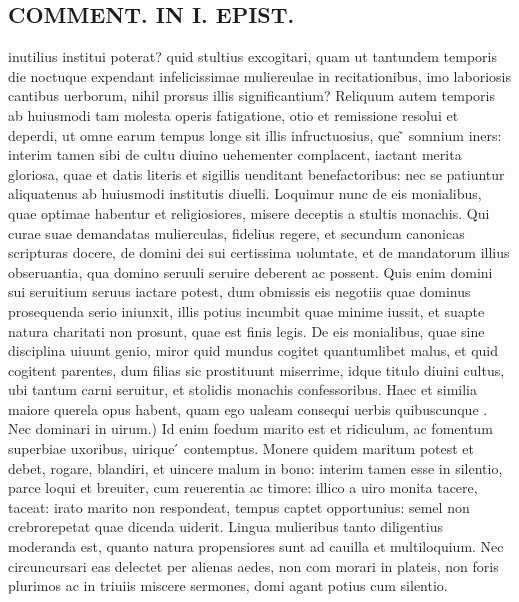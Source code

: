 \documentclass{article}
\begin{document}
\begin{pages}
\section*{COMMENT. IN I. EPIST. }
\marginpar{[ p.488 ]}\pstart inutilius institui poterat? quid stultius excogitari, quam ut tantundem temporis die noctuque expendant infelicissimae muliereulae in recitationibus, imo laboriosis cantibus uerborum, nihil prorsus illis significantium? Reliquum autem temporis ab huiusmodi tam molesta operis fatigatione, otio et remissione resolui et deperdi, ut omne earum tempus longe sit illis infructuosius, que ̃ somnium iners: interim tamen sibi de cultu diuino uehementer complacent, iactant merita gloriosa, quae et datis literis et sigillis uenditant benefactoribus: nec se patiuntur aliquatenus ab huiusmodi institutis diuelli. Loquimur nunc de eis monialibus, quae optimae habentur et religiosiores, misere deceptis a stultis monachis. Qui curae suae demandatas mulierculas, fidelius regere, et secundum canonicas scripturas docere, de domini dei sui certissima uoluntate, et de mandatorum illius obseruantia, qua domino seruuli seruire deberent ac possent. Quis enim domini sui seruitium seruus iactare potest, dum obmissis eis negotiis quae dominus prosequenda serio iniunxit, illis potius incumbit quae minime iussit, et suapte natura charitati non prosunt, quae est finis legis. De eis monialibus, quae sine disciplina uiuunt genio, miror quid mundus cogitet quantumlibet malus, et quid cogitent parentes, dum filias sic prostituunt miserrime, idque titulo diuini cultus, ubi tantum carni seruitur, et stolidis monachis confessoribus. Haec et similia maiore querela opus habent, quam ego ualeam consequi uerbis quibuscunque . Nec dominari in uirum.) Id enim foedum marito est et ridiculum, ac fomentum superbiae uxoribus, uirique ́ contemptus. Monere quidem maritum potest et debet, rogare, blandiri, et uincere malum in bono: interim tamen esse in silentio, parce loqui et breuiter, cum reuerentia ac timore: illico a uiro monita tacere, taceat: irato marito non respondeat, tempus captet opportunius: semel non crebrorepetat quae dicenda uiderit. Lingua mulieribus tanto diligentius moderanda est, quanto natura propensiores sunt ad cauilla et multiloquium. Nec circuncursari eas delectet per alienas aedes, non com morari in plateis, non foris plurimos ac in triuiis miscere sermones, domi agant potius cum silentio.  \pend
{}
{}

\end{pages}
\end{document}
